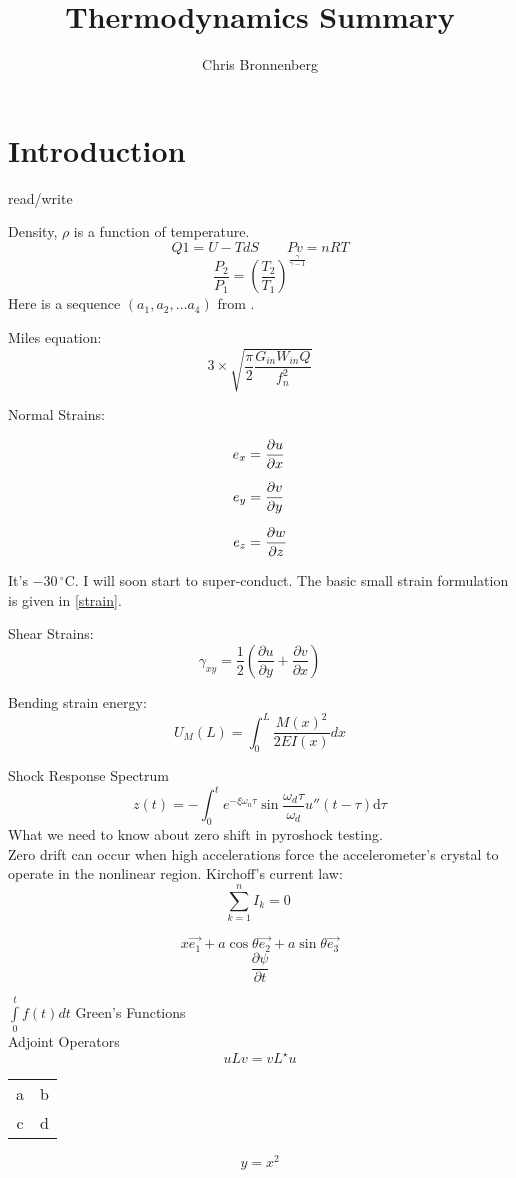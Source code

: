 \documentclass[11pt,letterpaper,titlepage]{article}
\author{Chris Bronnenberg}
\title{Thermodynamics Summary}
\newcommand{\nvector}[2]{#1_1, #1_2,\ldots #1_#2}
\newcommand{\MilesEq}{3\times\sqrt{\frac{\pi}{2}\frac{G_{in} W_{in} Q}{f_n^2}}}
\newcommand{\StrainX}{\frac{\partial u}{\partial x}}
\newcommand{\StrainY}{\frac{\partial v}{\partial y}}
\newcommand{\StrainZ}{\frac{\partial w}{\partial z}}
\newcommand{\ShearXY}{
	\frac{1}{2}\left(\frac{\partial u}{\partial y} +  
	\frac{\partial v}
	{\partial x} \right) 
}
\newcommand{\StrainEnergyBending}{
U_M (L)= \int_0^L \frac{M(x)^2}{2 E I(x)} dx
}
\newcommand{\KirchoffCurrentLaw}{
		\sum_{k=1}^{n} I_k = 0 \;
}
\begin{document}
\maketitle
\tableofcontents
\newpage

\section{Introduction}

read\slash write

Density, $\rho$ is a function of temperature.
$$
Q1 = U-T dS \qquad P v = n R T
$$
$$
\frac{P_2}{P_1} = \left( \frac{T_2}{T_1}\right)^{\frac{\gamma}{\gamma - 1}}
$$
Here is a sequence $\left(\nvector{a}{4}\right)$ from \cite{b_murri_payload_1987}.


Miles equation:
$$
\MilesEq
$$

Normal Strains:

\begin{align}\label{strain}
e_x  & = \StrainX \notag \\[6pt]
e_y  & = \StrainY \\[6pt]
e_z  & = \StrainZ \notag
\end{align}

It's $-30\,^{\circ}\mathrm{C}$. I will soon start to super-conduct.
The basic small strain formulation is given in \ref{strain}.

Shear Strains:
$$
\gamma_{xy} = \ShearXY
$$


Bending strain energy:
$$
\StrainEnergyBending
$$


Shock Response Spectrum \cite{LaLanne_Shock}
$$
z(t)=- \int_0^t    e^{-\xi \omega_n \tau}    \sin{ \frac{\omega_d \tau}{\omega_d} }  u''(t - \tau)    \mathrm{d} \tau
$$
What we need to know about zero shift in pyroshock testing.
\\
Zero drift can occur when high accelerations force the accelerometer's crystal to operate in the nonlinear region.
Kirchoff's current law:
$$
\KirchoffCurrentLaw
$$

$$
x \overrightarrow{e_1} + a \cos{\theta}  \overrightarrow{e_2} + a \sin{\theta}  \overrightarrow{e_3} 
$$
%
$$
\frac{\partial \psi }{\partial t}
$$

$\underset{0}{\overset{t}{\int }}f\left(t\right)dt$
Green's Functions \\
Adjoint Operators \\
$$
u L v = vL^{\star} u
$$

\begin{tabular}{cc}
	\hline 
	a & b \\ 

	c & d \\ 
	\hline 
\end{tabular} 


\[ y=x^2 \]



\printindex
\end{document}
